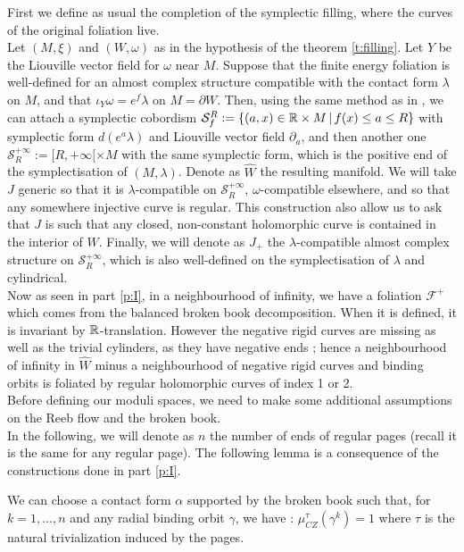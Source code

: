 \documentclass[../main.tex]{subfiles}
\begin{document}
First we define as usual the completion of the symplectic filling, where the curves of the original foliation live.\\
Let $(M,\xi)$ and $(W,\omega)$ as in the hypothesis of the theorem \ref{t:filling}. Let $Y$ be the Liouville vector field for $\omega$ near $M$. Suppose that the finite energy foliation is well-defined for an almost complex structure compatible with the contact form $\lambda$ on $M$, and that $\iota_{Y}\omega = e^{f}\lambda$ on $M = \partial W$. Then, using the same method as in \cite{wendl_strongly_2010}, we can attach a symplectic cobordism $\mathcal{S}_f^R := \{(a,x)\in\mathbb{R}\times M\,|\,f(x)\leq a \leq R\}$ with symplectic form $d(e^a\lambda)$ and Liouville vector field $\partial_a$, and then another one $\mathcal{S}_R^{+\infty}:= [R,+\infty[ \times M$ with the same symplectic form, which is the positive end of the symplectisation of $(M,\lambda)$. Denote as $\widehat{W}$ the resulting manifold. We will take $J$ generic so that it is $\lambda$-compatible on $\mathcal{S}_R^{+\infty}$, $\omega$-compatible elsewhere, and so that any somewhere injective curve is regular. This construction also allow us to ask that $J$ is such that any closed, non-constant holomorphic curve is contained in the interior of $W$. Finally, we will denote as $J_+$ the $\lambda$-compatible almost complex structure on $\mathcal{S}_R^{+\infty}$, which is also well-defined on the symplectisation of $\lambda$ and cylindrical.\\

Now as seen in part \ref{p:I}, in a neighbourhood of infinity, we have a foliation $\mathcal{F}^+$ which comes from the balanced broken book decomposition. When it is defined, it is invariant by $\mathbb{R}$-translation. However the negative rigid curves are missing as well as the trivial cylinders, as they have negative ends ; hence a neighbourhood of infinity in $\widehat{W}$ minus a neighbourhood of negative rigid curves and binding orbits is foliated by regular holomorphic curves of index 1 or 2. \\


Before defining our moduli spaces, we need to make some additional assumptions on the Reeb flow and the broken book.\\

In the following, we will denote as $n$ the number of ends of regular pages (recall it is the same for any regular page). The following lemma is a consequence of the constructions done in part \ref{p:I}.

\begin{lemma}
We can choose a contact form $\alpha$ supported by the broken book such that, for $k = 1,...,n$ and any radial binding orbit $\gamma$, we have : $\mu_{CZ}^\tau(\gamma^k) =1$ where $\tau$ is the natural trivialization induced by the pages.

\end{lemma}
\end{document}
